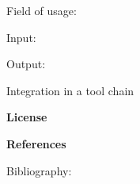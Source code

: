 	Field of usage:


	Input:

	Output:





	Integration in a tool chain



	\textbf{License}


	\textbf{References}

	Bibliography: